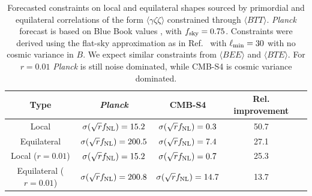 


\begin{table}[t]
  \begin{center}
    \begin{tabular}{ | c || c | c | c | c |}
      \hline
      Type & {\it Planck} & CMB-S4 & Rel. improvement  \\ \hline \hline
      Local & $\sigma(\sqrt{r}f_{\rm NL}) = 15.2$ & $\sigma(\sqrt{r}f_{\rm NL}) = 0.3$ & 50.7\\ \hline 
      Equilateral &  $\sigma(\sqrt{r}f_{\rm NL}) = 200.5$ & $\sigma(\sqrt{r}f_{\rm NL}) = 7.4$ & 27.1\\ \hline 
      Local ($r = 0.01$) & $\sigma(\sqrt{r}f_{\rm NL}) = 15.2$ & $\sigma(\sqrt{r}f_{\rm NL}) = 0.7$ & 25.3\\ \hline 
      Equilateral ($r = 0.01$) &  $\sigma(\sqrt{r}f_{\rm NL}) = 200.8$ & $\sigma(\sqrt{r}f_{\rm NL}) = 14.7$ & 13.7\\ \hline 
    \end{tabular}
  \end{center}
  \caption{Forecasted constraints on local and equilateral shapes sourced by primordial and equilateral correlations of the form $\langle \gamma \zeta\zeta \rangle$ constrained through $\langle BTT \rangle$. {\it Planck\/} forecast is based on Blue Book values \cite{planck2005-bluebook}, with $f_{\rm sky} = 0.75$. Constraints were derived using the flat-sky approximation as in Ref.~\cite{Meerburg:2016ecv} with $\ell_{\rm min} = 30$ with no cosmic variance in $B$.  We expect similar constraints from $\langle BEE \rangle$ and $\langle BTE \rangle$. For $r = 0.01$ {\it Planck\/} is still noise dominated, while CMB-S4 is cosmic variance dominated. }
\label{tab:fnl_forecast2}
\end{table}



